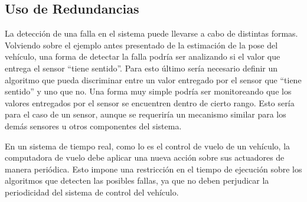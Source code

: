 
\subsection{Uso de Redundancias}


La detección de una falla en el sistema puede llevarse a cabo de distintas formas. Volviendo sobre el ejemplo antes presentado de la estimación de la pose del vehículo, una forma de detectar la falla podría ser analizando si el valor que entrega el sensor ``tiene sentido''. Para esto último sería necesario definir un algoritmo que pueda discriminar entre un valor entregado por el sensor que ``tiene sentido'' y uno que no. Una forma muy simple podría ser monitoreando que los valores entregados por el sensor se encuentren dentro de cierto rango. Esto sería para el caso de un sensor, aunque se requeriría un mecanismo similar para los demás sensores u otros componentes del sistema.

En un sistema de tiempo real, como lo es el control de vuelo de un vehículo, la computadora de vuelo debe aplicar una nueva acción sobre sus actuadores de manera periódica. Esto impone una restricción en el tiempo de ejecución sobre los algoritmos que detecten las posibles fallas, ya que no deben perjudicar la periodicidad del sistema de control del vehículo.

